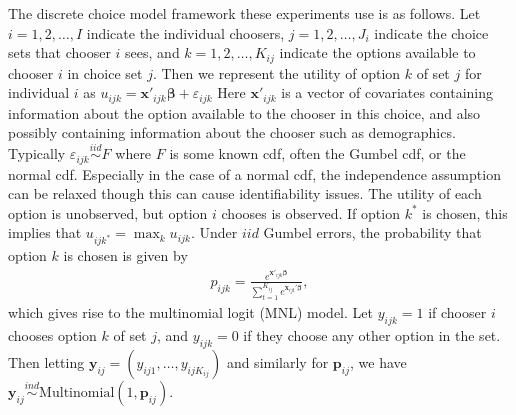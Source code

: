\documentclass[12pt]{article}
\begin{document}
The discrete choice model framework these experiments use is as follows. Let $i=1,2,\dots,I$ indicate the individual choosers, $j=1,2,\dots,J_i$ indicate the choice sets that chooser $i$ sees, and $k=1,2,\dots,K_{ij}$ indicate the options available to chooser $i$ in choice set $j$. Then we represent the utility of option $k$ of set $j$ for individual $i$ as $u_{ijk} = \bm{x}'_{ijk}\bm{\beta} + \varepsilon_{ijk}$ Here $\bm{x}'_{ijk}$ is a vector of covariates containing information about the option available to the chooser in this choice, and also possibly containing information about the chooser such as demographics. Typically $\varepsilon_{ijk}\stackrel{iid}{\sim} F$ where $F$ is some known cdf, often the Gumbel cdf, or the normal cdf. Especially in the case of a normal cdf, the independence assumption can be relaxed though this can cause identifiability issues. The utility of each option is unobserved, but option $i$ chooses is observed. If option $k^*$ is chosen, this implies that $u_{ijk^*} = \max_{k}u_{ijk}$. Under $iid$ Gumbel errors, the probability that option $k$ is chosen is given by
\begin{align*}
p_{ijk} = \frac{e^{\bm{x}'_{ijk}\bm{\beta}}}{\sum_{t=1}^{K_{ij}}e^{\bm{x}_{ijt}'\bm{\beta}}},
\end{align*}
which gives rise to the multinomial logit (MNL) model. Let $y_{ijk}=1$ if chooser $i$ chooses option $k$ of set $j$, and $y_{ijk}=0$ if they choose any other option in the set. Then letting $\bm{y}_{ij}=(y_{ij1},\dots,y_{ijK_{ij}})$ and similarly for $\bm{p}_{ij}$, we have $\bm{y}_{ij}\stackrel{ind}{\sim} \mathrm{Multinomial}(1, \bm{p}_{ij})$. 

\end{document}
